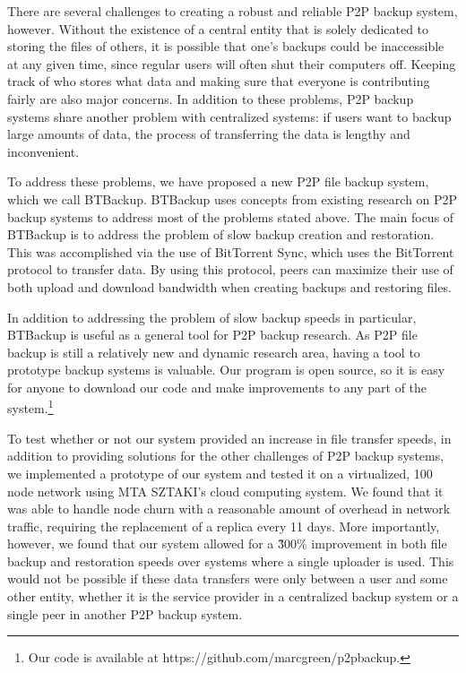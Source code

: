 \documentclass[12pt]{report}
\begin{document}
There are several challenges to creating a robust and reliable P2P backup system, however. Without the existence of a central entity that is solely dedicated to storing the files of others, it is possible that one's backups could be inaccessible at any given time, since regular users will often shut their computers off. Keeping track of who stores what data and making sure that everyone is contributing fairly are also major concerns. In addition to these problems, P2P backup systems share another problem with centralized systems: if users want to backup large amounts of data, the process of transferring the data is lengthy and inconvenient.

To address these problems, we have proposed a new P2P file backup system, which we call BTBackup. BTBackup uses concepts from existing research on P2P backup systems to address most of the problems stated above. The main focus of BTBackup is to address the problem of slow backup creation and restoration. This was accomplished via the use of BitTorrent Sync, which uses the BitTorrent protocol to transfer data. By using this protocol, peers can maximize their use of both upload and download bandwidth when creating backups and restoring files.

In addition to addressing the problem of slow backup speeds in particular, BTBackup is useful as a general tool for P2P backup research. As P2P file backup is still a relatively new and dynamic research area, having a tool to prototype backup systems is valuable. Our program is open source, so it is easy for anyone to download our code and make improvements to any part of the system.\footnote{Our code is available at https://github.com/marcgreen/p2pbackup.}

To test whether or not our system provided an increase in file transfer speeds, in addition to providing solutions for the other challenges of P2P backup systems, we implemented a prototype of our system and tested it on a virtualized, 100 node network using MTA SZTAKI's cloud computing system. We found that it was able to handle node churn with a reasonable amount of overhead in network traffic, requiring the replacement of a replica every 11 days. More importantly, however, we found that our system allowed for a \~300\% improvement in both file backup and restoration speeds over systems where a single uploader is used. This would not be possible if these data transfers were only between a user and some other entity, whether it is the service provider in a centralized backup system or a single peer in another P2P backup system.
\end{document}
